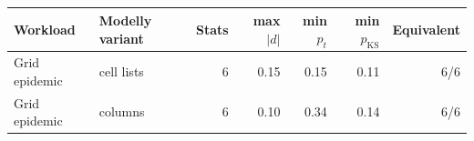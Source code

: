 \begin{tabular}{llrrrrr}
\toprule
Workload & Modelly variant & Stats & max $|d|$ & min $p_{t}$ & min $p_{\mathrm{KS}}$ & Equivalent \\
\midrule
Grid epidemic & cell lists & 6 & 0.15 & 0.15 & 0.11 & 6/6 \\
Grid epidemic & columns & 6 & 0.10 & 0.34 & 0.14 & 6/6 \\
\bottomrule
\end{tabular}
